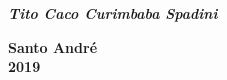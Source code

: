 \begin{titlepage}
		\vspace{1.0cm}

		\textit{\textbf{\LARGE Tito Caco Curimbaba Spadini}}\\[1.0cm]


		\vspace{0.5cm}


		{\textbf{\large Santo André}\\ \vspace{0.25cm}\textbf{\large 2019}}\\[2cm]

	\end{titlepage}
